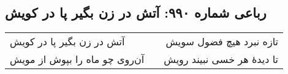 \begin{center}
\section*{رباعی شماره ۹۹۰: آتش در زن بگیر پا در کویش}
\label{sec:0990}
\begin{longtable}{l p{0.5cm} r}
آتش در زن بگیر پا در کویش
&&
تازه نبرد هیچ فضول سویش
\\
آن‌روی چو ماه را بپوش از مویش
&&
تا دیدهٔ هر خسی نبیند رویش
\\
\end{longtable}
\end{center}
